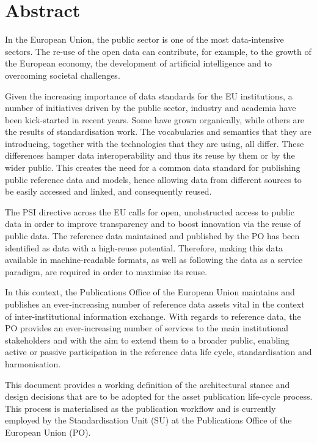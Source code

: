 \section*{Abstract}

    In the European Union, the public sector is one of the most data-intensive sectors. The re-use of the open data can contribute, for example, to the growth of the European economy, the development of artificial intelligence and to overcoming societal challenges.

	Given the increasing importance of data standards for the EU institutions, a number of initiatives driven by the public sector, industry and academia have been kick-started in recent years. Some have grown organically, while others are the results of standardisation work. The vocabularies and semantics that they are introducing, together with the technologies that they are using, all differ. These differences hamper data interoperability and thus its reuse by them or by the wider public. This creates the need for a common data standard for publishing public reference data and models, hence allowing data from different sources to be easily accessed and linked, and consequently reused.
	
	The PSI directive across the EU calls for open, unobstructed access to public data in order to improve transparency and to boost innovation via the reuse of public data. The reference data maintained and published by the PO has been identified as data with a high-reuse potential. Therefore, making this data available in machine-readable formats, as well as following the data as a service paradigm, are required in order to maximise its reuse.
	
	In this context, the Publications Office of the European Union maintains and publishes an ever-increasing number of reference data assets vital in the context of inter-institutional information exchange. With regards to reference data, the PO provides an ever-increasing number of services to the main institutional stakeholders and with the aim to extend them to a broader public, enabling active or passive participation in the reference data life cycle, standardisation and harmonisation.
	
	This document provides a working definition of the architectural stance and design decisions that are to be adopted for the asset publication life-cycle process. This process is materialised as the publication workflow and is currently employed by the Standardisation Unit (SU) at the Publications Office of the European Union (PO).
	
